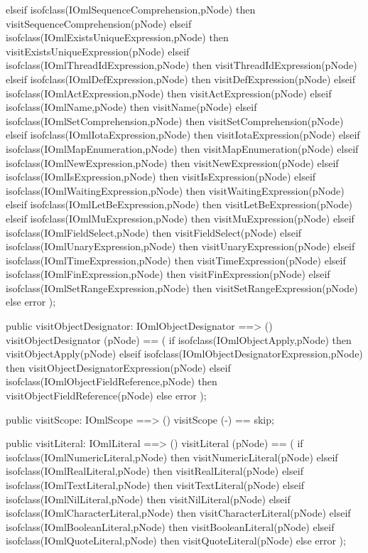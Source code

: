 \begin{vdm_al}
      elseif isofclass(IOmlSequenceComprehension,pNode) then visitSequenceComprehension(pNode)
      elseif isofclass(IOmlExistsUniqueExpression,pNode) then visitExistsUniqueExpression(pNode)
      elseif isofclass(IOmlThreadIdExpression,pNode) then visitThreadIdExpression(pNode)
      elseif isofclass(IOmlDefExpression,pNode) then visitDefExpression(pNode)
      elseif isofclass(IOmlActExpression,pNode) then visitActExpression(pNode)
      elseif isofclass(IOmlName,pNode) then visitName(pNode)
      elseif isofclass(IOmlSetComprehension,pNode) then visitSetComprehension(pNode)
      elseif isofclass(IOmlIotaExpression,pNode) then visitIotaExpression(pNode)
      elseif isofclass(IOmlMapEnumeration,pNode) then visitMapEnumeration(pNode)
      elseif isofclass(IOmlNewExpression,pNode) then visitNewExpression(pNode)
      elseif isofclass(IOmlIsExpression,pNode) then visitIsExpression(pNode)
      elseif isofclass(IOmlWaitingExpression,pNode) then visitWaitingExpression(pNode)
      elseif isofclass(IOmlLetBeExpression,pNode) then visitLetBeExpression(pNode)
      elseif isofclass(IOmlMuExpression,pNode) then visitMuExpression(pNode)
      elseif isofclass(IOmlFieldSelect,pNode) then visitFieldSelect(pNode)
      elseif isofclass(IOmlUnaryExpression,pNode) then visitUnaryExpression(pNode)
      elseif isofclass(IOmlTimeExpression,pNode) then visitTimeExpression(pNode)
      elseif isofclass(IOmlFinExpression,pNode) then visitFinExpression(pNode)
      elseif isofclass(IOmlSetRangeExpression,pNode) then visitSetRangeExpression(pNode)
      else error );

  public visitObjectDesignator: IOmlObjectDesignator ==> ()
  visitObjectDesignator (pNode) ==
    ( if isofclass(IOmlObjectApply,pNode) then visitObjectApply(pNode)
      elseif isofclass(IOmlObjectDesignatorExpression,pNode) then visitObjectDesignatorExpression(pNode)
      elseif isofclass(IOmlObjectFieldReference,pNode) then visitObjectFieldReference(pNode)
      else error );

  public visitScope: IOmlScope ==> ()
  visitScope (-) == skip;

  public visitLiteral: IOmlLiteral ==> ()
  visitLiteral (pNode) ==
    ( if isofclass(IOmlNumericLiteral,pNode) then visitNumericLiteral(pNode)
      elseif isofclass(IOmlRealLiteral,pNode) then visitRealLiteral(pNode)
      elseif isofclass(IOmlTextLiteral,pNode) then visitTextLiteral(pNode)
      elseif isofclass(IOmlNilLiteral,pNode) then visitNilLiteral(pNode)
      elseif isofclass(IOmlCharacterLiteral,pNode) then visitCharacterLiteral(pNode)
      elseif isofclass(IOmlBooleanLiteral,pNode) then visitBooleanLiteral(pNode)
      elseif isofclass(IOmlQuoteLiteral,pNode) then visitQuoteLiteral(pNode)
      else error );


\end{vdm_al}
